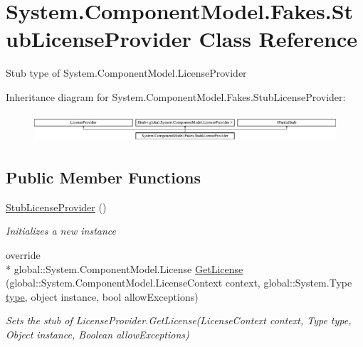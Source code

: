 \hypertarget{class_system_1_1_component_model_1_1_fakes_1_1_stub_license_provider}{\section{System.\-Component\-Model.\-Fakes.\-Stub\-License\-Provider Class Reference}
\label{class_system_1_1_component_model_1_1_fakes_1_1_stub_license_provider}
}


Stub type of System.\-Component\-Model.\-License\-Provider 


Inheritance diagram for System.\-Component\-Model.\-Fakes.\-Stub\-License\-Provider\-:\begin{figure}[H]
\begin{center}
\leavevmode
\includegraphics[height=1.069723cm]{class_system_1_1_component_model_1_1_fakes_1_1_stub_license_provider}
\end{center}
\end{figure}
\subsection*{Public Member Functions}
\begin{DoxyCompactItemize}
\item 
\hyperlink{class_system_1_1_component_model_1_1_fakes_1_1_stub_license_provider_a51b203e00e6b7853de3b9a4758cc2ff0}{Stub\-License\-Provider} ()
\begin{DoxyCompactList}\small\item\em Initializes a new instance\end{DoxyCompactList}\item 
override \\*
global\-::\-System.\-Component\-Model.\-License \hyperlink{class_system_1_1_component_model_1_1_fakes_1_1_stub_license_provider_a166bc6893dda5737ac2fdfe684d6fe30}{Get\-License} (global\-::\-System.\-Component\-Model.\-License\-Context context, global\-::\-System.\-Type \hyperlink{jquery-1_810_82-vsdoc_8js_a3940565e83a9bfd10d95ffd27536da91}{type}, object instance, bool allow\-Exceptions)
\begin{DoxyCompactList}\small\item\em Sets the stub of License\-Provider.\-Get\-License(\-License\-Context context, Type type, Object instance, Boolean allow\-Exceptions)\end{DoxyCompactList}\end{DoxyCompactItemize}
